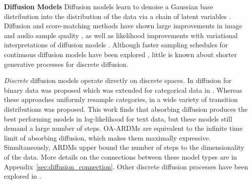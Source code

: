 \documentclass{article} \usepackage{iclr2022_conference,times}
\begin{document}
\textbf{Diffusion Models} \hspace{.2cm}
Diffusion models learn to denoise a Gaussian base distribution into the distribution of the data via a chain of latent variables \citep{song2019generativemodellingestimatinggradient,sohldickstein2015diffusion,ho2020denoising}. Diffusion and score-matching methods have shown large improvements in image \citep{dhariwal2021diffusionbeatgans} and audio sample quality \citep{chen2020wavegrad, kong2021diffwave}, as well as likelihood improvements with variational interpretations of diffusion models \citep{kingma2021vdm,huang2021variationalperspective}. Although faster sampling schedules for continuous diffusion models have been explored \citep{Jolicoeur2021gottagofast,kong2021onfastsampling}, little is known about shorter generative processes for discrete diffusion.

\textit{Discrete} diffusion models operate directly on discrete spaces. In \citet{sohldickstein2015diffusion} diffusion for binary data was proposed which was extended for categorical data in \citet{hoogeboom2021argmaxflows}. Whereas these approaches uniformly resample categories, in \citet{austin2021structured} a wide variety of transition distributions was proposed. This work finds that absorbing diffusion produces the best performing models in log-likelihood for text data, but these models still demand a large number of steps. OA-ARDMs are equivalent to the infinite time limit of absorbing diffusion, which makes them maximally expressive. Simultaneously, ARDMs upper bound the number of steps to the dimensionality of the data. More details on the connections between these model types are in Appendix~\ref{sec:diffusion_connection}. Other discrete diffusion processes have been explored in \citep{johnson2021beyondinplace}. 
 
\end{document}
